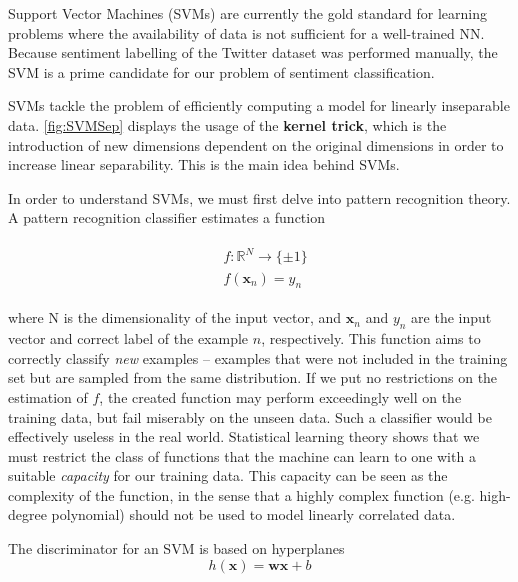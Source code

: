 \documentclass[12pt,a4paper,twoside,openright]{report}
\renewcommand{\vec}[1]{\mathbf{#1}}
\newcommand{\R}{\mathbb{R}}
\begin{document}

Support Vector Machines (SVMs) are currently the gold standard for learning problems where
the availability of data is not sufficient for a well-trained NN\cite{Fernandez14}. Because sentiment
labelling of the Twitter dataset was performed manually, the SVM is a prime candidate
for our problem of sentiment classification.

SVMs tackle the problem of efficiently computing a model
for linearly inseparable data. \cref{fig:SVMSep} displays the usage of the \textbf{kernel trick}, which is the
introduction of new dimensions dependent on the original dimensions in order to increase linear separability.
This is the main idea behind SVMs.

In order to understand SVMs, we must first delve into pattern recognition theory.
A pattern recognition classifier estimates a function

\begin{align}
\begin{split}
	&f:\R^N \rightarrow \{\pm 1\}\\
	&f(\vec{x}_n) = y_n
\end{split}
\end{align}

where N is the dimensionality of the input vector, and $\vec{x}_n$ and $y_n$ are the input vector and
correct label of the example $n$, respectively\cite{Hearst98}. This function aims to correctly classify
\textit{new} examples -- examples that were not included in the training set but are sampled from
the same distribution. If we put no restrictions on the estimation of $f$, the created function
may perform exceedingly well on the training data, but fail miserably on the unseen data. Such a
classifier would be effectively useless in the real world. Statistical learning theory shows that
we must restrict the class of functions that the machine can learn to one with a suitable \textit{capacity}
for our training data\cite{Vapnik99Stats}. This capacity can be seen as the complexity of the function, in the sense that a highly
complex function (e.g. high-degree polynomial) should not be used to model linearly correlated data.

The discriminator for an SVM is based on hyperplanes
\begin{equation}
	h(\vec{x}) = \vec{wx} + b
\end{equation}
\end{document}
